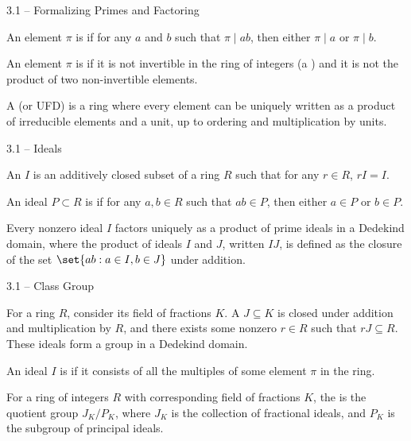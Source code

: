 \documentclass{beamer}
\theoremstyle{plain}
\begin{document}
\begin{frame}{3.1 -- Formalizing Primes and Factoring}
\begin{definition}
  An element $\pi$ is  if for any $a$ and $b$ such that $\pi \mid a
  b$, then either $\pi \mid a$ or $\pi \mid b$. 
\end{definition} \pause   
\begin{definition}
  An element $\pi$ is  if it is not invertible in the ring of
  integers (a ) and it is not the product of two non-invertible
  elements.      
\end{definition} \pause
\begin{definition}
  A  (or UFD) is a ring where every 
  element can be uniquely written as a product of irreducible elements and a unit, up to ordering and multiplication by units. 
\end{definition}
\end{frame}

\begin{frame}{3.1 -- Ideals}
 \begin{definition}
  An  $I$ is an additively closed subset of a ring $R$ such that
  for any $r \in R$, $rI = I$. 
\end{definition} \pause
\begin{definition}
  An ideal $P \subset R$ is  if for any $a, b \in R$ such that $ab
  \in P$, then either $a \in P$ or $b \in P$.   
\end{definition} \pause
\begin{theorem}
  Every nonzero ideal $I$ factors uniquely as a product of prime ideals in a
  Dedekind domain, where the product of ideals $I$ and $J$, written $IJ$, is defined as the
  closure of the set $\set{ab : a \in I, b\in J}$ under addition.  
\end{theorem}
\end{frame}

\begin{frame}{3.1 -- Class Group}
 \begin{definition}
  For a ring $R$, consider its field of fractions $K$. A 
  $J \subseteq K$ is closed under addition and multiplication by $R$, and there exists some nonzero $r \in R$ such that $rJ
  \subseteq R$. These ideals form a group in a Dedekind domain. 
\end{definition} \pause
\begin{definition}
  An ideal $I$ is  if it consists of all the multiples of some
  element $\pi$ in the ring.  
\end{definition} \pause
\begin{definition}
  For a ring of integers $R$ with corresponding field of fractions $K$, the
   is the quotient group $J_K / P_K$, where $J_K$ is the
  collection of fractional ideals, and $P_K$ is the subgroup of principal
  ideals. 
\end{definition} 
\end{frame}
\end{document}
